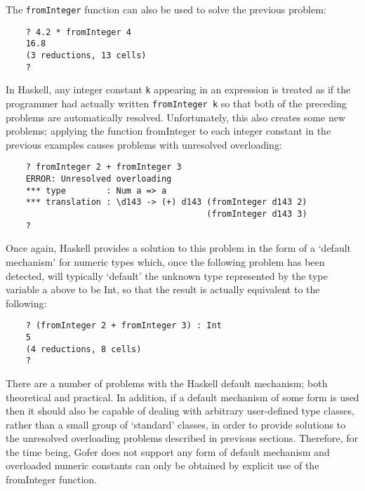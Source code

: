 The \verb"fromInteger" function  can  also  be  used  to  solve  the  previous
problem:
\begin{verbatim}
    ? 4.2 * fromInteger 4
    16.8
    (3 reductions, 13 cells)
    ?
\end{verbatim}
In Haskell, any integer  constant  \verb"k"  appearing  in  an  expression  is
treated as if the programmer had actually written  \verb"fromInteger k"  so
that  both  of  the  preceding  problems  are  automatically  resolved.
Unfortunately, this  also  creates  some  new  problems;  applying  the
function fromInteger to each  integer  constant  in  the previous  examples
causes problems with unresolved overloading:
\begin{verbatim}
    ? fromInteger 2 + fromInteger 3
    ERROR: Unresolved overloading
    *** type        : Num a => a
    *** translation : \d143 -> (+) d143 (fromInteger d143 2)
                                        (fromInteger d143 3)
    ?
\end{verbatim}
Once again, Haskell provides a solution to this problem in the form  of
a `default mechanism' for  numeric  types  which,  once  the  following
problem has been detected, will typically `default'  the  unknown  type
represented by the type variable a above to be Int, so that the  result
is actually equivalent to the following:
\begin{verbatim}
    ? (fromInteger 2 + fromInteger 3) : Int
    5
    (4 reductions, 8 cells)
    ?
\end{verbatim}
There are a number of problems with the Haskell default mechanism; both
theoretical and practical.  In addition, if a default mechanism of some
form is used then it should also be capable of dealing  with  arbitrary
user-defined type classes, rather than  a  small  group  of  `standard'
classes, in order to provide solutions to  the  unresolved  overloading
problems described in  previous  sections.   Therefore,  for  the  time
being, Gofer does  not  support  any  form  of  default  mechanism  and
overloaded numeric constants can only be obtained by  explicit  use  of
the fromInteger function.


